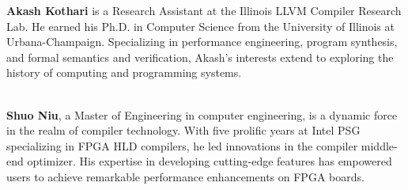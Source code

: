 \textbf{Akash Kothari} is a Research Assistant at the Illinois LLVM Compiler Research Lab. He earned his Ph.D. in Computer Science from the University of Illinois at Urbana-Champaign. Specializing in performance engineering, program synthesis, and formal semantics and verification, Akash’s interests extend to exploring the history of computing and programming systems.

\hspace*{\fill} \\

\textbf{Shuo Niu}, a Master of Engineering in computer engineering, is a dynamic force in the realm of compiler technology. With five prolific years at Intel PSG specializing in FPGA HLD compilers, he led innovations in the compiler middle-end optimizer. His expertise in developing cutting-edge features has empowered users to achieve remarkable performance enhancements on FPGA boards.